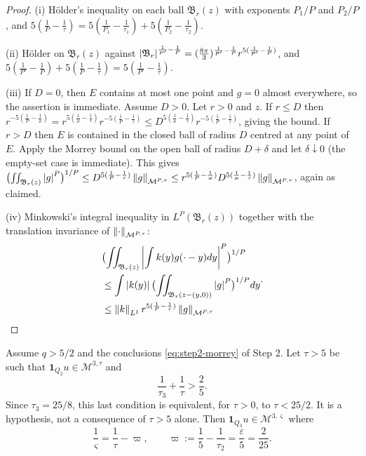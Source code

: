 \documentclass[11pt,reqno]{amsart}
\begin{document}
\begin{proof}
(i) H\"older's inequality on each ball $\mathfrak{B}_{r}(z)$ with exponents
$P_{1}/P$ and $P_{2}/P$, and
$5(\tfrac1P-\tfrac1\tau)=5(\tfrac1{P_{1}}-\tfrac1{\tau_{1}})
 +5(\tfrac1{P_{2}}-\tfrac1{\tau_{2}})$.

(ii) H\"older on $\mathfrak{B}_{r}(z)$ against
$\left\lvert \mathfrak{B}_{r} \right\rvert^{\frac1{P'}-\frac1P}
 =(\tfrac{8\pi}{3})^{\frac1{P'}-\frac1P}r^{5(\frac1{P'}-\frac1P)}$, and
$5(\tfrac1{P'}-\tfrac1P)+5(\tfrac1P-\tfrac1\tau)=5(\tfrac1{P'}-\tfrac1\tau)$.

(iii) If $D=0$, then $E$ contains at most one point and $g=0$ almost
everywhere, so the assertion is immediate. Assume $D>0$.
Let $r>0$ and $z$. If $r\le D$ then
$r^{-5(\frac1P-\frac1\varkappa)}=r^{5(\frac1\varkappa-\frac1\tau)}
 r^{-5(\frac1P-\frac1\tau)}\le D^{5(\frac1\varkappa-\frac1\tau)}
 r^{-5(\frac1P-\frac1\tau)}$, giving the bound. If $r>D$ then
$E$ is contained in the closed ball of radius $D$ centred at any point
of $E$. Apply the Morrey bound on the open ball of radius $D+\delta$
and let $\delta\downarrow0$ (the empty-set case is immediate). This gives
$\bigl(\iint_{\mathfrak{B}_{r}(z)}\left\lvert g \right\rvert^{P}\bigr)^{1/P}
 \le D^{5(\frac1P-\frac1\tau)}\left\lVert g \right\rVert_{\mathcal{M}^{P,\tau}}
 \le r^{5(\frac1P-\frac1\varkappa)}D^{5(\frac1\varkappa-\frac1\tau)}
    \left\lVert g \right\rVert_{\mathcal{M}^{P,\tau}}$, again as claimed.

(iv) Minkowski's integral inequality in $L^{P}(\mathfrak{B}_{r}(z))$ together
with the translation invariance of $\left\lVert \cdot \right\rVert_{\mathcal{M}^{P,\tau}}$:
\[
\begin{aligned}
&\bigl(\iint_{\mathfrak{B}_{r}(z)}\left\lvert \int k(y)g(\cdot-y)dy \right\rvert^{P}\bigr)^{1/P}
\\ &\le\int\left\lvert k(y) \right\rvert\bigl(\iint_{\mathfrak{B}_{r}(z-(y,0))}\left\lvert g \right\rvert^{P}\bigr)^{1/P}dy
\\ &\le\left\lVert k \right\rVert_{L^{1}}r^{5(\frac1P-\frac1\tau)}\left\lVert g \right\rVert_{\mathcal{M}^{P,\tau}}
\end{aligned}
.
\]
\end{proof}

\begin{proposition}\label{prop:bootstrap}
Assume $q>5/2$ and the conclusions \eqref{eq:step2-morrey} of Step 2.
Let $\tau>5$ be such that
$\mathbf{1}_{Q_{2}}u\in\mathcal{M}^{3,\tau}$ and
\begin{equation}\label{eq:bootstrap-cond}
  \frac1{\tau_{3}}+\frac1\tau>\frac25 .
\end{equation}
Since $\tau_3=25/8$, this last condition is equivalent, for $\tau>0$,
to $\tau<25/2$. It is a hypothesis, not a consequence of $\tau>5$ alone.
Then $\mathbf{1}_{Q_{3}}u\in\mathcal{M}^{3,\varsigma}$ where
\begin{equation}\label{eq:bootstrap-gain}
  \frac1\varsigma=\frac1\tau-\varpi,
  \qquad \varpi:=\frac15-\frac1{\tau_{2}}=\frac{\varepsilon}{5}=\frac2{25}.
\end{equation}
\end{proposition}
\end{document}
